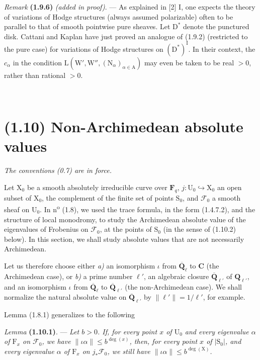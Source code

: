 \documentclass[11pt,leqno]{article}
\newcommand{\Page}[1]{\ifvmode\noindent\else\unskip\ \fi{\footnotesize\textcolor{gray}{[p.\,#1]}}\ \ignorespaces}
\begin{document}
\textit{Remark} \textbf{(1.9.6)} \textit{(added in proof)}. — As explained in [2] I, one expects the theory of variations of Hodge structures (always assumed polarizable) often to be parallel to that of smooth pointwise pure sheaves. Let \(\mathrm{D}^*\) denote the punctured disk. Cattani and Kaplan have just proved an analogue of (1.9.2) (restricted to the pure case) for variations of Hodge structures on \((\mathrm{D}^*)^{\mathrm{I}}\). In their context, the \(c_\alpha\) in the condition \(\mathrm{L}(\mathrm{W}',\mathrm{W}'',(\mathrm{N}_\alpha)_{\alpha\in\mathrm{A}})\) may even be taken to be real \(>0\), rather than rational \(>0\).

\Page{182}
\section*{(1.10) Non-Archimedean absolute values}

\textit{The conventions \textup{(0.7)} are in force.}

Let \(\mathrm{X}_0\) be a smooth absolutely irreducible curve over \(\mathbf{F}_q\), \(j:\mathrm{U}_0\hookrightarrow\mathrm{X}_0\) an open subset of \(\mathrm{X}_0\), the complement of the finite set of points \(\mathrm{S}_0\), and \(\mathscr{F}_0\) a smooth sheaf on \(\mathrm{U}_0\). In n\textsuperscript{o} (1.8), we used the trace formula, in the form (1.4.7.2), and the structure of local monodromy, to study the Archimedean absolute value of the eigenvalues of Frobenius on \(\mathscr{F}_0\), at the points of \(\mathrm{S}_0\) (in the sense of (1.10.2) below). In this section, we shall study absolute values that are not necessarily Archimedean.

Let us therefore choose either \textit{a)} an isomorphism \(\iota\) from \(\overline{\mathbf{Q}}_\ell\) to \(\mathbf{C}\) (the Archimedean case), or \textit{b)} a prime number \(\ell'\), an algebraic closure \(\overline{\mathbf{Q}}_{\ell'}\) of \(\mathbf{Q}_{\ell'}\), and an isomorphism \(\iota\) from \(\overline{\mathbf{Q}}_\ell\) to \(\overline{\mathbf{Q}}_{\ell'}\) (the non-Archimedean case). We shall normalize the natural absolute value on \(\overline{\mathbf{Q}}_{\ell'}\) by \(\lVert\ell'\rVert=1/\ell'\), for example.

Lemma (1.8.1) generalizes to the following

\textit{Lemma} \textbf{(1.10.1)}. — \textit{Let \(b>0\). If, for every point \(x\) of \(\mathrm{U}_0\) and every eigenvalue \(\alpha\) of \(\mathrm{F}_x\) on \(\mathscr{F}_0\), we have \(\lVert\iota\alpha\rVert\leq b^{\deg(x)}\), then, for every point \(x\) of \(\lvert\mathrm{S}_0\rvert\), and every eigenvalue \(\alpha\) of \(\mathrm{F}_x\) on \(j_*\mathscr{F}_0\), we still have \(\lVert\iota\alpha\rVert\leq b^{\deg(\mathrm{X})}\).}
\end{document}
